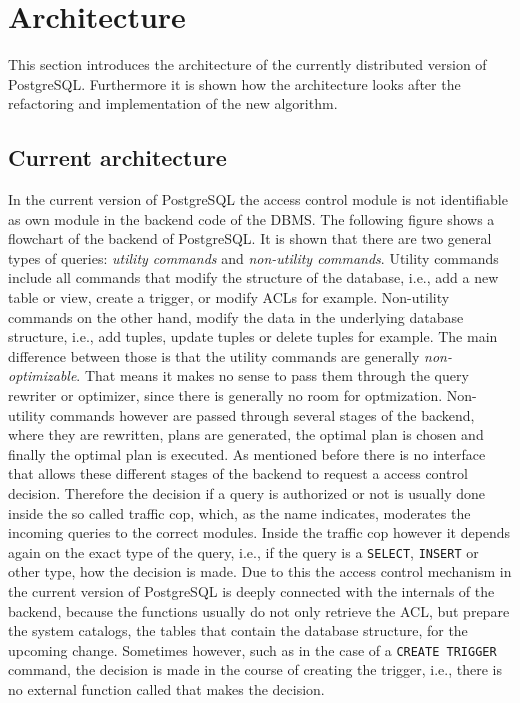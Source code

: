 \section{Architecture}
%
This section introduces the architecture of the currently distributed version of PostgreSQL.
%
Furthermore it is shown how the architecture looks after the refactoring and implementation of the new algorithm.
%
\subsection{Current architecture}
%
In the current version of PostgreSQL the access control module is not identifiable as own module in the backend code of the DBMS.
%
The following figure shows a flowchart of the backend of PostgreSQL.
%
It is shown that there are two general types of queries: \emph{utility commands} and \emph{non-utility commands}.
%
Utility commands include all commands that modify the structure of the database, i.e., add a new table or view, create a trigger, or modify ACLs for example.
%
Non-utility commands on the other hand, modify the data in the underlying database structure, i.e., add tuples, update tuples or delete tuples for example.
%
The main difference between those is that the utility commands are generally \emph{non-optimizable}.
%
That means it makes no sense to pass them through the query rewriter or optimizer, since there is generally no room for optmization.
%
Non-utility commands however are passed through several stages of the backend, where they are rewritten, plans are generated, the optimal plan is chosen and finally the optimal plan is executed.
%
As mentioned before there is no interface that allows these different stages of the backend to request a access control decision.
%
Therefore the decision if a query is authorized or not is usually done inside the so called traffic cop, which, as the name indicates, moderates the incoming queries to the correct modules.
%
Inside the traffic cop however it depends again on the exact type of the query, i.e., if the query is a \texttt{SELECT}, \texttt{INSERT} or other type, how the decision is made.
%
Due to this the access control mechanism in the current version of PostgreSQL is deeply connected with the internals of the backend, because the functions usually do not only retrieve the ACL, but prepare the system catalogs, the tables that contain the database structure, for the upcoming change.
%
Sometimes however, such as in the case of a \texttt{CREATE TRIGGER} command, the decision is made in the course of creating the trigger, i.e., there is no external function called that makes the decision.
